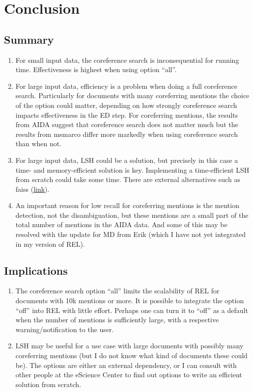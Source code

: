 \documentclass[a4paper,11pt]{article}
\numberwithin{equation}{section} %
\begin{document}
\section{Conclusion}

\subsection{Summary}
\begin{enumerate}
 \item For small input data, the coreference search is inconsequential for running time. Effectiveness is highest when using option ``all''.
 \item For large input data, efficiency is a problem when doing a full coreference search. Particularly for documents with many coreferring mentions the choice of the option could matter, depending on how strongly coreference search impacts effectiveness in the ED step. For coreferring mentions, the results from AIDA suggest that coreference search does not matter much but the results from msmarco differ more markedly when using coreference search than when not.
 \item For large input data, LSH could be a solution, but precisely in this case a time- and memory-efficient solution is key. Implementing a time-efficient LSH from scratch could take some time. There are external alternatives such as faiss (\href{https://github.com/facebookresearch/faiss}{\underline{link}}).
 \item An important reason for low recall for coreferring mentions is the mention detection, not the disambiguation, but these mentions are a small part of the total number of mentions in the AIDA data. And some of this may be resolved with the update for MD from Erik (which I have not yet integrated in my version of REL).
\end{enumerate}

\subsection{Implications}

\begin{enumerate}
 \item The coreference search option ``all'' limits the scalability of REL for documents with 10k mentions or more. It is possible to integrate the option ``off'' into REL with little effort. Perhaps one can turn it to ``off'' as a default when the number of mentions is sufficiently large, with a respective warning/notification to the user. 
 \item LSH may be useful for a use case with large documents with possibly many coreferring mentions (but I do not know what kind of documents these could be). The options are either an external dependency, or I can consult with other people at the eScience Center to find out options to write an efficient solution from scratch.
\end{enumerate}
\end{document}
